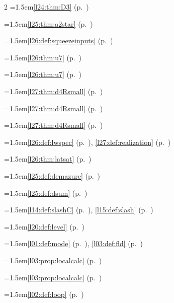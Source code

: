 \begin{multicols}{2}
\hangindent=1.5em\quad \ref{l24:thm:D3} (p.~\pageref{l24:thm:D3})\par
\hangindent=1.5em\quad \ref{l25:thm:a2star} (p.~\pageref{l25:thm:a2star})\par
\hangindent=1.5em\quad \ref{l26:def:squeezeinputs} (p.~\pageref{l26:def:squeezeinputs})\par
\hangindent=1.5em\quad \ref{l26:thm:u7} (p.~\pageref{l26:thm:u7})\par
\hangindent=1.5em\quad \ref{l26:thm:u7} (p.~\pageref{l26:thm:u7})\par
\hangindent=1.5em\quad \ref{l27:thm:d4Rsmall} (p.~\pageref{l27:thm:d4Rsmall})\par
\hangindent=1.5em\quad \ref{l27:thm:d4Rsmall} (p.~\pageref{l27:thm:d4Rsmall})\par
\hangindent=1.5em\quad \ref{l27:thm:d4Rsmall} (p.~\pageref{l27:thm:d4Rsmall})\par
\hangindent=1.5em\quad \ref{l26:def:lwspec} (p.~\pageref{l26:def:lwspec}), \ref{l27:def:realization} (p.~\pageref{l27:def:realization})\par
\hangindent=1.5em\quad \ref{l26:thm:latsat} (p.~\pageref{l26:thm:latsat})\par
\hangindent=1.5em\quad \ref{l25:def:demazure} (p.~\pageref{l25:def:demazure})\par
\hangindent=1.5em\quad \ref{l25:def:dsum} (p.~\pageref{l25:def:dsum})\par
\hangindent=1.5em\quad \ref{l14:def:slashC} (p.~\pageref{l14:def:slashC}), \ref{l15:def:slash} (p.~\pageref{l15:def:slash})\par
\hangindent=1.5em\quad \ref{l20:def:level} (p.~\pageref{l20:def:level})\par
\hangindent=1.5em\quad \ref{l01:def:mode} (p.~\pageref{l01:def:mode}), \ref{l03:def:fld} (p.~\pageref{l03:def:fld})\par
\hangindent=1.5em\quad \ref{l03:prop:localcalc} (p.~\pageref{l03:prop:localcalc})\par
\hangindent=1.5em\quad \ref{l03:prop:localcalc} (p.~\pageref{l03:prop:localcalc})\par
\hangindent=1.5em\quad \ref{l02:def:loop} (p.~\pageref{l02:def:loop})\par

\end{multicols}
